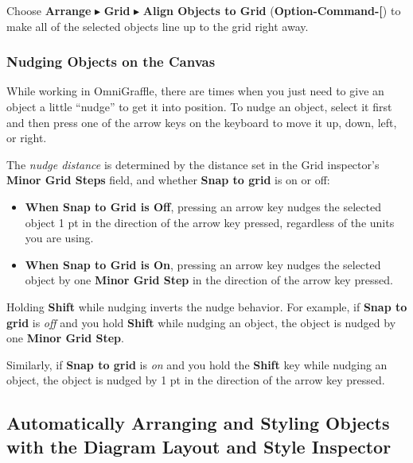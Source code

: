\documentclass[../main.tex]{subfiles}
\begin{document}
\begin{ogtip}
  Choose \textbf{Arrange} $\blacktriangleright$ \textbf{Grid} $\blacktriangleright$ \textbf{Align
  Objects to Grid} (\textbf{Option-Command-[}) to make all of the selected objects line up to
    the grid right away.
  \end{ogtip}

  \subsubsection{Nudging Objects on the Canvas}

  While working in OmniGraffle, there are times when you just need to give an object a little
  ``nudge'' to get it into position. To nudge an object, select it first and then press one of
  the arrow keys on the keyboard to move it up, down, left, or right.

  The \textit{nudge distance} is determined by the distance set in the Grid inspector's
  \textbf{Minor Grid Steps} field, and whether \textbf{Snap to grid} is on or off:

  \begin{itemize}
    \item \textbf{When Snap to Grid is Off}, pressing an arrow key nudges the selected object 1 pt
      in the direction of the arrow key pressed, regardless of the units you are using.
    \item \textbf{When Snap to Grid is On}, pressing an arrow key nudges the selected object by
      one \textbf{Minor Grid Step} in the direction of the arrow key pressed.
  \end{itemize}

  \begin{ogtip}
    Holding \textbf{Shift} while nudging inverts the nudge behavior. For example, if \textbf{Snap to
    grid} is \textit{off} and you hold \textbf{Shift} while nudging an object, the object is
    nudged by one \textbf{Minor Grid Step}.

    Similarly, if \textbf{Snap to grid} is \textit{on} and you hold the \textbf{Shift} key while
    nudging an object, the object is nudged by 1 pt in the direction of the arrow key pressed.
  \end{ogtip}

  \subsection{Automatically Arranging and Styling Objects with the Diagram Layout and Style
  Inspector}
\end{document}
